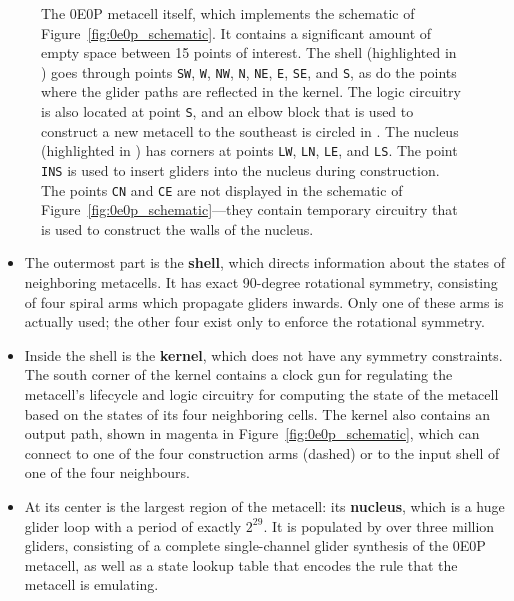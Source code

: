 \begin{figure}[!phtb]
	\centering
		\caption{The 0E0P metacell itself, which implements the schematic of Figure~\ref{fig:0e0p_schematic}. It contains a significant amount of empty space between 15 points of interest. The shell (highlighted in ) goes through points \texttt{SW}, \texttt{W}, \texttt{NW}, \texttt{N}, \texttt{NE}, \texttt{E}, \texttt{SE}, and \texttt{S}, as do the points where the glider paths are reflected in the kernel. The logic circuitry is also located at point \texttt{S}, and an elbow block that is used to construct a new metacell to the southeast is circled in . The nucleus (highlighted in ) has corners at points \texttt{LW}, \texttt{LN}, \texttt{LE}, and \texttt{LS}. The point \texttt{INS} is used to insert gliders into the nucleus during construction. The points \texttt{CN} and \texttt{CE} are not displayed in the schematic of Figure~\ref{fig:0e0p_schematic}---they contain temporary circuitry that is used to construct the walls of the nucleus.}\label{fig:0e0p_itself}
\end{figure}

\begin{itemize}
	\item The outermost part is the \textbf{shell}, which directs information about the states of neighboring metacells. It has exact 90-degree rotational symmetry, consisting of four spiral arms which propagate gliders inwards. Only one of these arms is actually used; the other four exist only to enforce the rotational symmetry.\smallskip
	
	\item Inside the shell is the \textbf{kernel}, which does not have any symmetry constraints. The south corner of the kernel contains a clock gun for regulating the metacell's lifecycle and logic circuitry for computing the state of the metacell based on the states of its four neighboring cells. The kernel also contains an output path, shown in magenta in Figure~\ref{fig:0e0p_schematic}, which can connect to one of the four construction arms (dashed) or to the input shell of one of the four neighbours.\smallskip
	
	\item At its center is the largest region of the metacell: its \textbf{nucleus}, which is a huge glider loop with a period of exactly $2^{29}$. It is populated by over three million gliders, consisting of a complete single-channel glider synthesis of the 0E0P metacell, as well as a state lookup table that encodes the rule that the metacell is emulating.\smallskip
\end{itemize}

